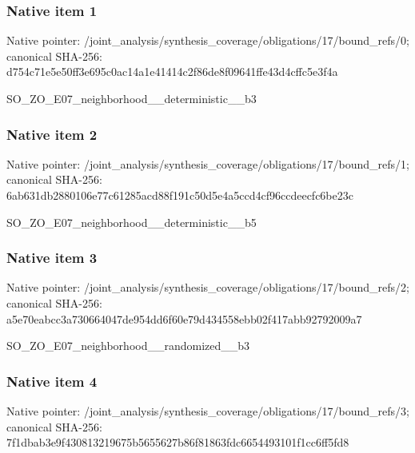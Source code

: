 \documentclass[10pt,a4paper]{article}
\begin{document}
\subsubsection{Native item 1}
Native pointer: /joint\_\allowbreak{}analysis/synthesis\_\allowbreak{}coverage/obligations/17/bound\_\allowbreak{}refs/0; canonical SHA-256: d754c71e5e50ff3e695c0ac14a1e41414c2f86de8f09641ffe43d4cffc5e3f4a

\begingroup\raggedright\sloppy SO\_\allowbreak{}ZO\_\allowbreak{}E07\_\allowbreak{}neighborhood\_\allowbreak{}\_\allowbreak{}deterministic\_\allowbreak{}\_\allowbreak{}b3\par\endgroup

\subsubsection{Native item 2}
Native pointer: /joint\_\allowbreak{}analysis/synthesis\_\allowbreak{}coverage/obligations/17/bound\_\allowbreak{}refs/1; canonical SHA-256: 6ab631db2880106e77c61285acd88f191c50d5e4a5ccd4cf96ccdeecfc6be23c

\begingroup\raggedright\sloppy SO\_\allowbreak{}ZO\_\allowbreak{}E07\_\allowbreak{}neighborhood\_\allowbreak{}\_\allowbreak{}deterministic\_\allowbreak{}\_\allowbreak{}b5\par\endgroup

\subsubsection{Native item 3}
Native pointer: /joint\_\allowbreak{}analysis/synthesis\_\allowbreak{}coverage/obligations/17/bound\_\allowbreak{}refs/2; canonical SHA-256: a5e70eabcc3a730664047de954dd6f60e79d434558ebb02f417abb92792009a7

\begingroup\raggedright\sloppy SO\_\allowbreak{}ZO\_\allowbreak{}E07\_\allowbreak{}neighborhood\_\allowbreak{}\_\allowbreak{}randomized\_\allowbreak{}\_\allowbreak{}b3\par\endgroup

\subsubsection{Native item 4}
Native pointer: /joint\_\allowbreak{}analysis/synthesis\_\allowbreak{}coverage/obligations/17/bound\_\allowbreak{}refs/3; canonical SHA-256: 7f1dbab3e9f430813219675b5655627b86f81863fdc6654493101f1cc6ff5fd8
\end{document}
